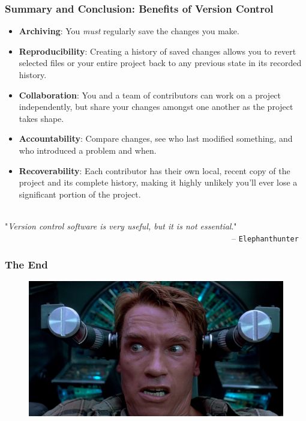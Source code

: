 \documentclass{beamer}
\begin{document}
\begin{frame}
   \frametitle{Summary and Conclusion: Benefits of Version Control}
   \begin{itemize}
      \setlength\itemsep{1.0em}\footnotesize
      \item \textbf{Archiving}: You \textit{must} regularly save the
         changes you make.
      \item \textbf{Reproducibility}: Creating a history of saved
         changes allows you to revert selected files or your entire
         project back to any previous state in its recorded history.
      \item \textbf{Collaboration}: You and a team of contributors can
         work on a project independently, but share your changes amongst
         one another as the project takes shape.
      \item \textbf{Accountability}: Compare changes, see who last
         modified something, and who introduced a problem and when.
      \item \textbf{Recoverability}: Each contributor has their own
         local, recent copy of the project and its complete history,
         making it highly unlikely you'll ever lose a significant
         portion of the project.
   \end{itemize}
   \ \\
   "\textit{Version control software is very useful, but it is not essential}." \\
   \ \ \ \ \ \ \ \ \ \ \ \ \ \ \ \ \ \ \ \ \ \ \ \ \ \ \ \ \ \  \ \ \ \ \ \ \ \ \ \ \ \ \ \ \ \ \ \ \ \ \ \ \ \ -- \texttt{Elephanthunter}
\end{frame}

\begin{frame}
   \frametitle{The End}
   \begin{figure}[htbp]
      \includegraphics[width=1.0\textwidth]{images/total-recall.jpg}
   \end{figure}
\end{frame}
\end{document}

